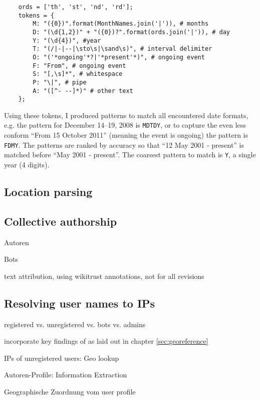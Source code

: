 \begin{lstlisting}
	ords = ['th', 'st', 'nd', 'rd'];
	tokens = {
		M: "({0})".format(MonthNames.join('|')), # months
		D: "(\d{1,2})" + "({0})?".format(ords.join('|')), # day
		Y: "(\d{4})", #year
		T: "(/|-|--|\sto\s|\sand\s)", # interval delimiter
		O: "('*ongoing'*?|'*present'*)", # ongoing event
		F: "From", # ongoing event
		S: "[,\s]*", # whitespace
		P: "\|", # pipe
		A: "([^- --]*)" # other text
	};
\end{lstlisting}

Using these tokens, I produced patterns to match all encountered date formats, e.g. the pattern for December 14--19, 2008 is \verb"MDTDY", or to capture the even less conform ``From 15 October 2011'' (meaning the event is ongoing) the pattern is \verb"FDMY".
The patterns are ranked by accuracy so that ``12 May 2001 - present'' is matched before ``May 2001 - present''.
The coarsest pattern to match is \verb"Y", a single year (4 digits).

\subsection{Location parsing}


\subsection{Collective authorship}


\begin{todos}
    \item Autoren
    \item Bots
    \item text attribution, using wikitrust annotations, not for all revisions
\end{todos}



\subsection{Resolving user names to IPs}

\begin{todos}
    \item registered vs. unregistered vs. bots vs. admins
    \item incorporate key findings of \cite{hardy2011volunteered} as laid out in chapter \ref{sec:georeference}
    \item IPs of unregistered users: Geo lookup
    \item Autoren-Profile: Information Extraction
    \item Geographische Zuordnung vom user profile
\end{todos}

